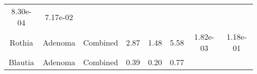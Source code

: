 \documentclass[12pt,]{article}
\begin{document}
\begin{longtable}[]{@{}cccccccc@{}}
\begin{minipage}[t]{0.06\columnwidth}
8.30e-04\strut
\end{minipage} & \begin{minipage}[t]{0.06\columnwidth}\centering\strut
7.17e-02\strut
\end{minipage}\tabularnewline
\begin{minipage}[t]{0.18\columnwidth}\centering\strut
Rothia\strut
\end{minipage} & \begin{minipage}[t]{0.07\columnwidth}\centering\strut
Adenoma\strut
\end{minipage} & \begin{minipage}[t]{0.09\columnwidth}\centering\strut
Combined\strut
\end{minipage} & \begin{minipage}[t]{0.03\columnwidth}\centering\strut
2.87\strut
\end{minipage} & \begin{minipage}[t]{0.14\columnwidth}\centering\strut
1.48\strut
\end{minipage} & \begin{minipage}[t]{0.14\columnwidth}\centering\strut
5.58\strut
\end{minipage} & \begin{minipage}[t]{0.06\columnwidth}\centering\strut
1.82e-03\strut
\end{minipage} & \begin{minipage}[t]{0.06\columnwidth}\centering\strut
1.18e-01\strut
\end{minipage}\tabularnewline
\begin{minipage}[t]{0.18\columnwidth}\centering\strut
Blautia\strut
\end{minipage} & \begin{minipage}[t]{0.07\columnwidth}\centering\strut
Adenoma\strut
\end{minipage} & \begin{minipage}[t]{0.09\columnwidth}\centering\strut
Combined\strut
\end{minipage} & \begin{minipage}[t]{0.03\columnwidth}\centering\strut
0.39\strut
\end{minipage} & \begin{minipage}[t]{0.14\columnwidth}\centering\strut
0.20\strut
\end{minipage} & \begin{minipage}[t]{0.14\columnwidth}\centering\strut
0.77\strut
\end{minipage} & \begin{minipage}[t]{0.06\columnwidth}\centering\strut

\end{minipage}
\end{longtable}
\end{document}
